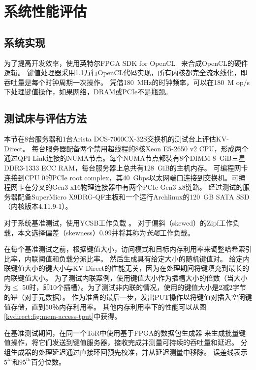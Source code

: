 \section{系统性能评估}
\label{kvdirect:sec:eval}
\label{kvdirect:sec:evaluation}
\label{kvdirect:sec:system-benchmark}

\subsection{系统实现}

为了提高开发效率，使用英特尔FPGA SDK for OpenCL~ \cite {aoc}来合成OpenCL的硬件逻辑。
键值处理器采用1.1万行OpenCL代码实现，所有内核都完全流水线化，即吞吐量是每个时钟周期一次操作。
凭借180~MHz的时钟频率，可以在180~M op/s下处理键值操作，如果网络，DRAM或PCIe不是瓶颈。




\subsection{测试床与评估方法}

本节在8台服务器和1台Arista DCS-7060CX-32S交换机的测试台上评估KV-Direct。
每台服务器配备两个禁用超线程的8核Xeon E5-2650 v2 CPU，形成两个通过QPI Link连接的NUMA节点。每个NUMA节点都装有8个DIMM 8~GiB三星DDR3-1333 ECC RAM，每台服务器上总共有128~GiB的主机内存。
可编程网卡~ \cite {caulfield2016cloud}连接到CPU 0的PCIe root complex，其40~Gbps以太网端口连接到交换机。可编程网卡在分叉的Gen3 x16物理连接器中有两个PCIe Gen3 x8链路。
经过测试的服务器配备SuperMicro X9DRG-QF主板和一个运行Archlinux的120~GB SATA SSD（内核版本4.11.9-1）。

对于系统基准测试，使用YCSB工作负载 \cite {cooper2010benchmarking}。
对于偏斜（skewed）的Zipf工作负载，本文选择偏差（skewness）0.99并将其称为\textit {长尾}工作负载。

在每个基准测试之前，根据键值大小，访问模式和目标内存利用率来调整哈希索引比率，内联阈值和负载分派比率。
然后生成具有给定大小的随机键值对。
给定内联键值大小的键大小与KV-Direct的性能无关，因为在处理期间将键填充到最长的内联键值大小。
为了测试内联案例，使用键值大小作为插槽大小的倍数（当大小为$ \leq $ 50时，即10个插槽）。为了测试非内联的情况，使用的键值大小是2减2字节的幂（对于元数据）。
作为准备的最后一步，发出PUT操作以将键值对插入空闲键值存储，直到50％内存利用率。
其他内存利用率下的性能可以从图 \ref {kvdirect:fig:mem-access-tput}中获得。

在基准测试期间，在同一个ToR中使用基于FPGA的数据包生成器 \cite {li2016clicknp}来生成批量键值操作，将它们发送到键值服务器，接收完成并测量可持续的吞吐量和延迟。
分组生成器的处理延迟通过直接环回预先校准，并从延迟测量中移除。
误差线表示$ 5^{th} $和$ 95^{th} $百分位数。

